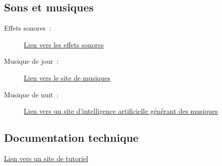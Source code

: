 \documentclass[a4paper,12pt]{article}
\begin{document}
\begin{appendices}
\subsection{Sons et musiques}
\begin{description}
	\item[Effets sonores :] \href{https://pixabay.com/fr/sound-effects/}{Lien vers les effets sonores}
	\item[Musique de jour :] \href{https://www.jamendo.com/?language=fr}{Lien vers le site de musiques}
	\item[Musique de nuit :] \href{https://www.udio.com/}{Lien vers un site d'intelligence artificielle générant des musiques}
\end{description}

\subsection{Documentation technique}
\href{https://openclassrooms.com/forum/sujet/projet-termine-jeu-de-plateforme-cree-en-sdl-2}{Lien vers un site de tutoriel}

%

\end{appendices}

\end{document}
